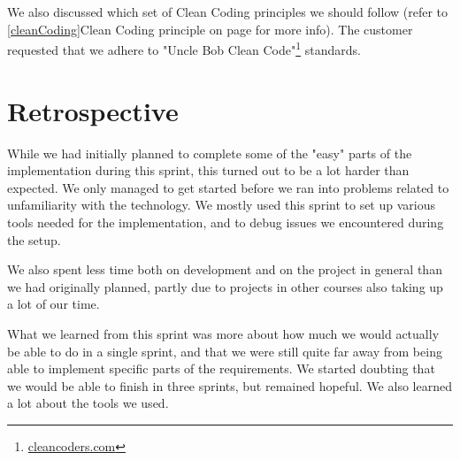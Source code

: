 We also discussed which set of Clean Coding principles we should follow (refer to \ref{cleanCoding}Clean Coding principle on page \pageref{cleanCoding} for more info). The customer requested that we adhere to "Uncle Bob Clean Code"\footnote{\href{http://cleancoders.com}{cleancoders.com}} standards.

\section{Retrospective}
While we had initially planned to complete some of the "easy" parts of the implementation during this sprint, this turned out to be a lot harder than expected. We only managed to get started before we ran into problems related to unfamiliarity with the technology. We mostly used this sprint to set up various tools needed for the implementation, and to debug issues we encountered during the setup.

We also spent less time both on development and on the project in general than we had originally planned, partly due to projects in other courses also taking up a lot of our time.

What we learned from this sprint was more about how much we would actually be able to do in a single sprint, and that we were still quite far away from being able to implement specific parts of the requirements. We started doubting that we would be able to finish in three sprints, but remained hopeful. We also learned a lot about the tools we used.
